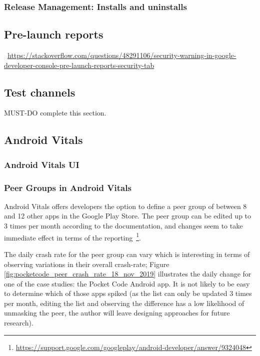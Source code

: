 \subsubsection{Release Management: Installs and uninstalls}




\subsection{Pre-launch reports}

~\url{https://stackoverflow.com/questions/48291106/security-warning-in-google-developer-console-pre-launch-reports-security-tab}

\subsection{Test channels}\label{subsection-test-channels}
MUST-DO complete this section.

\subsection{Android Vitals}
\subsubsection{Android Vitals UI}

\subsubsection{Peer Groups in Android Vitals}\label{android-vitals-peer-groups}
Android Vitals offers developers the option to define a peer group of between 8 and 12 other apps in the Google Play Store. The peer group can be edited up to 3 times per month according to the documentation, and changes seem to take immediate effect in terms of the reporting~\footnote{\url{https://support.google.com/googleplay/android-developer/answer/9324048}}.

The daily crash rate for the peer group can vary which is interesting in terms of observing variations in their overall crash-rate; Figure \ref{fig:pocketcode_peer_crash_rate_18_nov_2019} illustrates the daily change for one of the case studies: the Pocket Code Android app. It is not likely to be easy to determine which of those apps spiked (as the list can only be updated 3 times per month, editing the list and observing the difference has a low likelihood of unmasking the peer, the author will leave designing approaches for future research).

